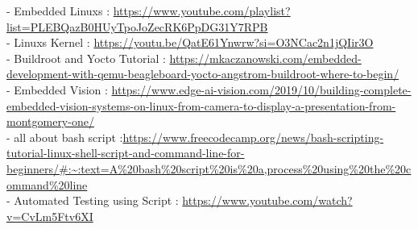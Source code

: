 - Embedded Linuxs : \url{https://www.youtube.com/playlist?list=PLEBQazB0HUyTpoJoZecRK6PpDG31Y7RPB }\\
- Linuxs Kernel : \url{https://youtu.be/QatE61Ynwrw?si=O3NCac2n1jQIir3O }\\
- Buildroot and Yocto Tutorial : \url{https://mkaczanowski.com/embedded-development-with-qemu-beagleboard-yocto-angstrom-buildroot-where-to-begin/ }\\
- Embedded Vision : \url{https://www.edge-ai-vision.com/2019/10/building-complete-embedded-vision-systems-on-linux-from-camera-to-display-a-presentation-from-montgomery-one/ }\\
- all about bash script :\url{https://www.freecodecamp.org/news/bash-scripting-tutorial-linux-shell-script-and-command-line-for-beginners/#:~:text=A%20bash%20script%20is%20a,process%20using%20the%20command%20line} \\
- Automated Testing using Script : \url{https://www.youtube.com/watch?v=CvLm5Ftv6XI }\\
\fi

